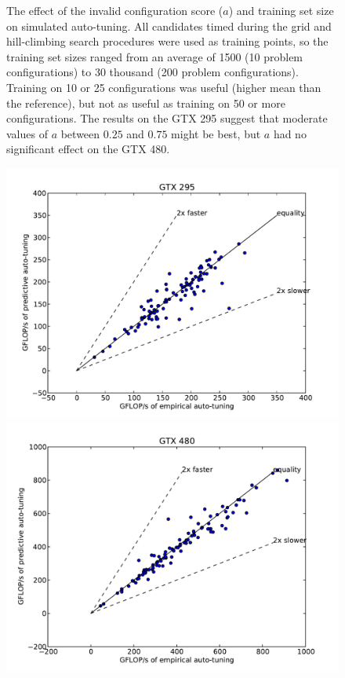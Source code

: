 \documentclass{sig-alternate}
\begin{document}
\begin{figure}
\caption{The effect of the invalid configuration score ($a$) and training set
size on simulated auto-tuning.
All candidates timed during the grid and
hill-climbing search procedures were used as training points, so the training
set sizes ranged from an average of 1500 (10 problem configurations) to 30
thousand (200 problem configurations).
Training on 10 or 25 configurations was useful (higher mean than the reference),
but not as useful as training on 50 or more configurations.
The results on the GTX 295 suggest that
moderate values of $a$ between $0.25$ and $0.75$ might be
best, but $a$ had no significant effect on the GTX 480.
}
\label{fig:fig_ntrain}
\end{figure}

\begin{figure}
\centering
\includegraphics[scale=.42]{fig_gflop_scatter_295.pdf}
\includegraphics[scale=.42]{fig_gflop_scatter_480.pdf}

\end{figure}
\end{document}
